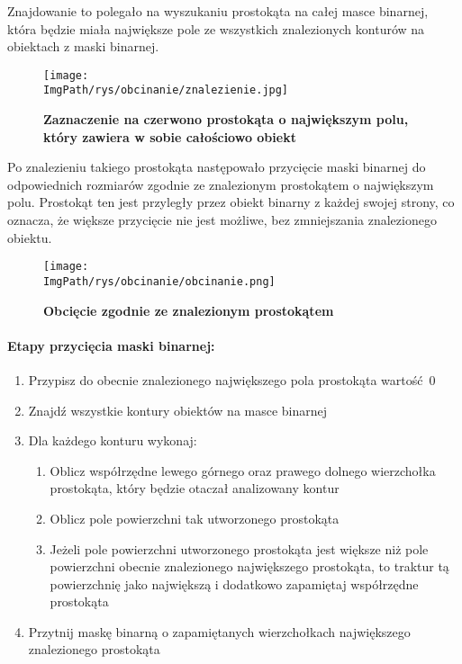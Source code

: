 \documentclass[a4paper,12pt,twoside,openany]{report}
\newcommand{\ImgPath}{.}
\begin{document}
Znajdowanie to polegało na wyszukaniu prostokąta na całej masce binarnej, która będzie miała największe pole ze wszystkich znalezionych konturów na obiektach z maski binarnej. 

\begin{figure}[H]
	\centering
	{\label{fig:a}\texttt{[image: \\ImgPath/rys/obcinanie/znalezienie.jpg]}}
	\caption{  \textbf{Zaznaczenie na czerwono prostokąta o największym polu, który zawiera w sobie całościowo obiekt}}
\end{figure}

Po znalezieniu takiego prostokąta następowało przycięcie maski binarnej do odpowiednich rozmiarów zgodnie ze znalezionym prostokątem o największym polu. Prostokąt ten jest przyległy przez obiekt binarny z każdej swojej strony, co oznacza, że większe przycięcie nie jest możliwe, bez zmniejszania znalezionego obiektu.

\begin{figure}[H]
	\centering
	{\label{fig:b}\texttt{[image: \\ImgPath/rys/obcinanie/obcinanie.png]}}
	\caption{  \textbf{Obcięcie zgodnie ze znalezionym prostokątem}}
\end{figure}
\paragraph{Etapy przycięcia maski binarnej:}
\begin{enumerate}
	\item Przypisz do obecnie znalezionego największego pola prostokąta wartość~0
	\item Znajdź wszystkie kontury obiektów na masce binarnej
	\item Dla każdego konturu wykonaj:
	\begin{enumerate}
		\item Oblicz współrzędne lewego górnego oraz prawego dolnego wierzchołka prostokąta, który będzie otaczał analizowany kontur 
		\item Oblicz pole powierzchni tak utworzonego prostokąta
		\item Jeżeli pole powierzchni utworzonego prostokąta jest większe niż pole powierzchni obecnie znalezionego największego prostokąta, to traktur tą powierzchnię jako największą i dodatkowo zapamiętaj współrzędne prostokąta
	\end{enumerate}
	\item Przytnij maskę binarną o zapamiętanych wierzchołkach największego znalezionego prostokąta
\end{enumerate}
\end{document}
